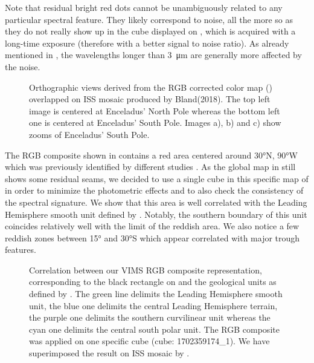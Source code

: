 \documentclass{arxiv-icarus}
\begin{document}
Note that residual bright red dots cannot be unambiguously related to any particular spectral feature. They likely correspond to noise, all the more so as they do not really show up in the cube displayed on , which is acquired with a long-time exposure (therefore with a better signal to noise ratio). As already mentioned in , the wavelengths longer than \SI{3}{\um} are generally more affected by the noise.

\begin{figure}[!ht]
    \caption{Orthographic views derived from the RGB corrected color map () overlapped on ISS mosaic produced by Bland(2018). The top left image is centered at Enceladus' North Pole whereas the bottom left one is centered at Enceladus' South Pole. Images a), b) and c) show zooms of Enceladus' South Pole.}
    \label{fig:fig_11}
\end{figure}

The RGB composite shown in  contains a red area centered around \ang{30}N, \ang{90}W which was previously identified by different studies \citep{Ries2015, Scipioni2017, Combe2019}. As the global map in  still shows some residual seams, we decided to use a single cube in this specific map of  in order to minimize the photometric effects and to also check the consistency of the spectral signature. We show that this area is well correlated with the Leading Hemisphere smooth unit defined by \cite{Crow-Willard2015}. Notably, the southern boundary of this unit coincides relatively well with the limit of the reddish area. We also notice a few reddish zones between \ang{15} and \ang{30}S which appear correlated with major trough features.

\begin{figure}[!ht]
    \caption{Correlation between our VIMS RGB composite representation, corresponding to the black rectangle on  and the geological units as defined by \cite{Crow-Willard2015}. The green line delimits the Leading Hemisphere smooth unit, the blue one delimits the central Leading Hemisphere terrain, the purple one delimits the southern curvilinear unit whereas the cyan one delimits the central south polar unit. The RGB composite was applied on one specific cube (cube: 1702359174\_1). We have superimposed the result on ISS mosaic by \cite{Bland2018}.}
    \label{fig:fig_12}
\end{figure}
\end{document}
